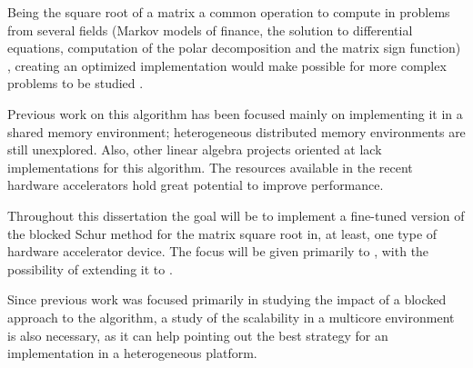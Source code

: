 Being the square root of a matrix a common operation to compute in problems from several fields (Markov models of finance, the solution to differential equations, computation of the polar decomposition and the matrix sign function) \cite{Higham:2008:FM}, creating an optimized implementation would make possible for more complex problems to be studied \cite{Hill:Marty:2008}.

Previous work on this algorithm has been focused mainly on implementing it in a \cpu shared memory environment; heterogeneous distributed memory environments are still unexplored. Also, other linear algebra projects oriented at \gpus lack implementations for this algorithm. The resources available in the recent hardware accelerators hold great potential to improve performance.

Throughout this dissertation the goal will be to implement a fine-tuned version of the blocked Schur method for the matrix square root in, at least, one type of hardware accelerator device. The focus will be given primarily to \gpus, with the possibility of extending it to \mics.

Since previous work was focused primarily in studying the impact of a blocked approach to the algorithm, a study of the scalability in a multicore environment is also necessary, as it can help pointing out the best strategy for an implementation in a heterogeneous platform.
